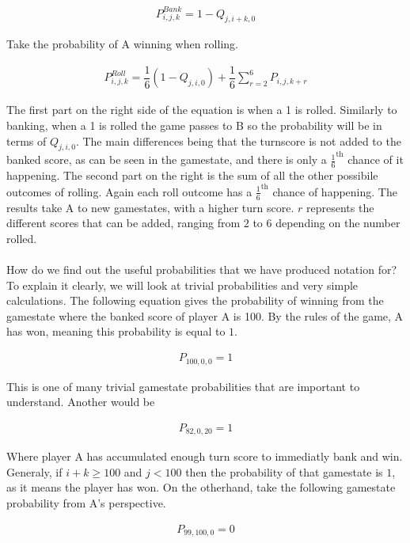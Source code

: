 \documentclass[a4paper,titlepage]{article}
\begin{document}
\begin{align*}
P^{Bank}_{i,j,k} = 1-Q_{j,i+k,0}
\end{align*}

Take the probability of A winning when rolling.

\begin{align*}
P^{Roll}_{i,j,k} = \dfrac{1}{6} (1-Q_{j,i,0}) + \dfrac{1}{6}\sum^{6}_{r=2}P_{i,j,k+r}
\end{align*}

The first part on the right side of the equation is when a 1 is rolled. Similarly to banking, when a 1 is rolled the game passes to B so the probability will be in terms of $Q_{j,i,0}$.
The main differences being that the turnscore is not added to the banked score, as can be seen in the gamestate, and there is only a $\frac{1}{6}^\text{th}$ chance of it happening.
The second part on the right is the sum of all the other possibile outcomes of rolling. Again each roll outcome has a $\frac{1}{6}^\text{th}$ chance of happening.
The results take A to new gamestates, with a higher turn score. $r$ represents the different scores that can be added, ranging from $2$ to $6$ depending on the number rolled.
\\
\\
How do we find out the useful probabilities that we have produced notation for?
To explain it clearly, we will look at trivial probabilities and very simple calculations.
The following equation gives the probability of winning from the gamestate where the banked score of player A is 100. By the rules of the game, A has won, meaning this probability is equal to $1$.

\begin{align*}
	P_{100,0,0}=1
\end{align*}

This is one of many trivial gamestate probabilities that are important to understand. Another would be

\begin{align*}
	P_{82,0,20}=1
\end{align*}

Where player A has accumulated enough turn score to immediatly bank and win.
Generaly, if $i+k\geq100$ and $j<100$ then the probability of that gamestate is $1$, as it means the player has won.
On the otherhand, take the following gamestate probability from A's perspective.

\begin{align*}
	P_{99,100,0}=0
\end{align*}
\end{document}
